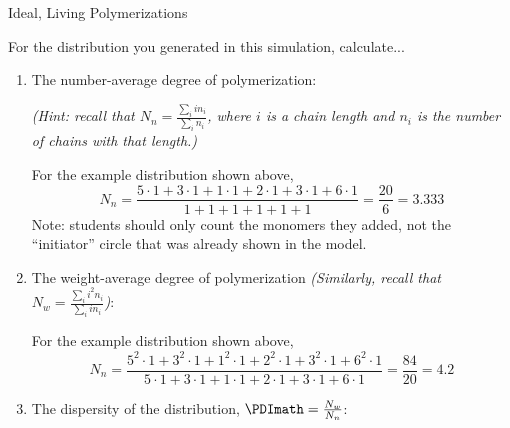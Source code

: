 \begin{activity}{Ideal, Living Polymerizations}
\begin{model}
		\vspace{-18pt}
		\begin{solution}\end{solution} %
	
\end{model}

\begin{ctqs}
	
	\question For the distribution you generated in this simulation, calculate... \label{\labelbase:ctq:simulationcalcs}
	
		\begin{enumerate}
			\item The number-average degree of polymerization:
			
				\emph{(Hint: recall that $N_n = \frac{\sum_i i n_i}{\sum_i n_i}$, where $i$ is a chain length and $n_i$ is the number of chains with that length.)}
			
				\begin{solution}[2in]
					For the example distribution shown above,
					\begin{equation*}
						N_n = \frac{5\cdot 1 + 3\cdot 1 + 1\cdot 1 + 2\cdot 1 + 3\cdot 1 + 6\cdot 1}{1+1+1+1+1+1} = \frac{20}{6}=3.333
					\end{equation*}
					Note: students should only count the monomers they added, not the ``initiator'' circle that was already shown in the model.
				\end{solution}
			
			\clearpage
			\item The weight-average degree of polymerization \emph{(Similarly, recall that $N_w= \frac{\sum_i i^2 n_i}{\sum_i i n_i}$)}:
			
				\begin{solution}[1.25in]
					For the example distribution shown above,
					\begin{equation*}
						N_n = \frac{5^2\cdot 1 + 3^2\cdot 1 + 1^2\cdot 1 + 2^2\cdot 1 + 3^2\cdot 1 + 6^2\cdot 1}{5\cdot 1 + 3\cdot 1 + 1\cdot 1 + 2\cdot 1 + 3\cdot 1 + 6\cdot 1} = \frac{84}{20}=4.2
					\end{equation*}
				\end{solution}
			
			\item The dispersity of the distribution, $\PDImath = \frac{N_w}{N_n}$:
			

\end{enumerate}
\end{ctqs}
\end{activity}
